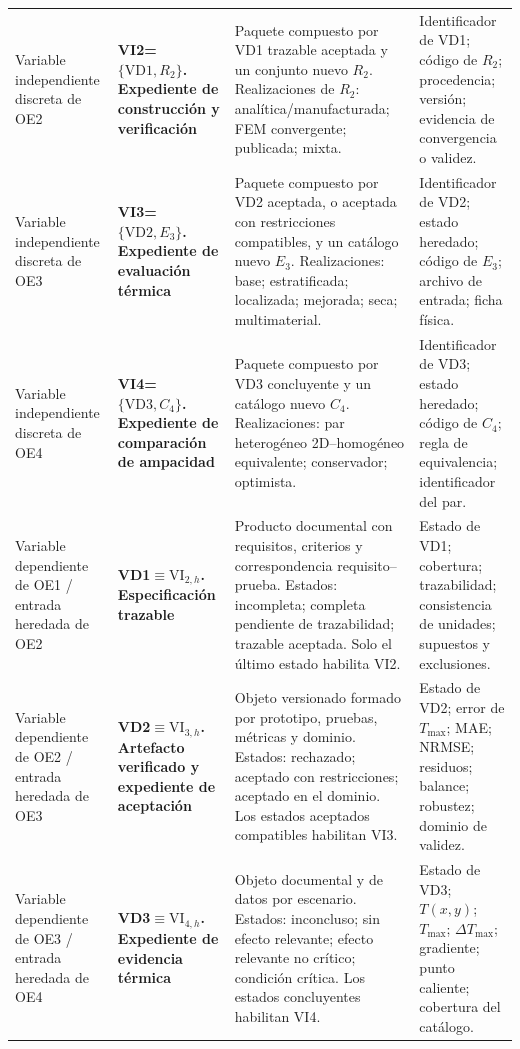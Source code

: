 \documentclass[11pt,a4paper,oneside]{report}
\newcommand{\Tmax}{T_{\max}}
\begin{document}
\begin{singlespace}
\begin{landscape}
\begin{longtable}{L{4.00cm}L{4.20cm}L{8.20cm}L{6.30cm}}
Variable independiente discreta de OE2 & \textbf{VI2=$\{\mathrm{VD1},R_2\}$. Expediente de construcción y verificación} & Paquete compuesto por VD1 trazable aceptada y un conjunto nuevo $R_2$. Realizaciones de $R_2$: analítica/manufacturada; FEM convergente; publicada; mixta. & Identificador de VD1; código de $R_2$; procedencia; versión; evidencia de convergencia o validez. \\

Variable independiente discreta de OE3 & \textbf{VI3=$\{\mathrm{VD2},E_3\}$. Expediente de evaluación térmica} & Paquete compuesto por VD2 aceptada, o aceptada con restricciones compatibles, y un catálogo nuevo $E_3$. Realizaciones: base; estratificada; localizada; mejorada; seca; multimaterial. & Identificador de VD2; estado heredado; código de $E_3$; archivo de entrada; ficha física. \\

Variable independiente discreta de OE4 & \textbf{VI4=$\{\mathrm{VD3},C_4\}$. Expediente de comparación de ampacidad} & Paquete compuesto por VD3 concluyente y un catálogo nuevo $C_4$. Realizaciones: par heterogéneo 2D--homogéneo equivalente; conservador; optimista. & Identificador de VD3; estado heredado; código de $C_4$; regla de equivalencia; identificador del par. \\

Variable dependiente de OE1 / entrada heredada de OE2 & \textbf{VD1$\equiv\mathrm{VI}_{2,h}$. Especificación trazable} & Producto documental con requisitos, criterios y correspondencia requisito--prueba. Estados: incompleta; completa pendiente de trazabilidad; trazable aceptada. Solo el último estado habilita VI2. & Estado de VD1; cobertura; trazabilidad; consistencia de unidades; supuestos y exclusiones. \\

Variable dependiente de OE2 / entrada heredada de OE3 & \textbf{VD2$\equiv\mathrm{VI}_{3,h}$. Artefacto verificado y expediente de aceptación} & Objeto versionado formado por prototipo, pruebas, métricas y dominio. Estados: rechazado; aceptado con restricciones; aceptado en el dominio. Los estados aceptados compatibles habilitan VI3. & Estado de VD2; error de $\Tmax$; MAE; NRMSE; residuos; balance; robustez; dominio de validez. \\

Variable dependiente de OE3 / entrada heredada de OE4 & \textbf{VD3$\equiv\mathrm{VI}_{4,h}$. Expediente de evidencia térmica} & Objeto documental y de datos por escenario. Estados: inconcluso; sin efecto relevante; efecto relevante no crítico; condición crítica. Los estados concluyentes habilitan VI4. & Estado de VD3; $T(x,y)$; $\Tmax$; $\Delta\Tmax$; gradiente; punto caliente; cobertura del catálogo. \\


\end{longtable}
\end{landscape}
\end{singlespace}
\end{document}

